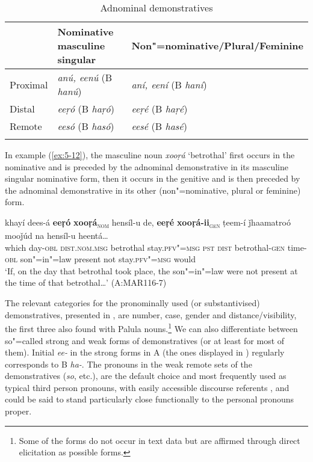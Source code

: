 \begin{table}[ht]
\caption{Adnominal demonstratives}
\begin{tabularx}{\textwidth}{ l@{\hspace{30pt}} Q Q }
\lsptoprule
&
Nominative masculine singular &
Non"=nominative/{\allowbreak}Plural/{\allowbreak}Feminine\\\hline
Proximal &
\textit{anú, eenú} (B \textit{hanú}) &
\textit{aní, eení} (B \textit{haní})\\
Distal &
\textit{eeṛó} (B \textit{haṛó}) &
\textit{eeṛé} (B \textit{haṛé})\\
Remote &
\textit{eesó} (B \textit{hasó}) &
\textit{eesé} (B \textit{hasé})\\\lspbottomrule
\end{tabularx}
\label{tab:5-3}
\end{table}



In example (\ref{ex:5-12}), the masculine noun \textit{xooṛá} `betrothal' first occurs in the nominative and is preceded by the adnominal demonstrative in its masculine singular nominative form, then it occurs in the genitive and is then preceded by the adnominal demonstrative in its other (non"=nominative, plural or feminine) form.


\begin{exe}
\ex
\label{ex:5-12}
\gll khayí dees-á {\ob}\textbf{eeṛó} \textbf{xooṛá}{\cb}\textsc{\textsubscript{nom}} hensíl-u de, {\ob}\textbf{eeṛé}
 \textbf{xooṛá-ii}{\cb}\textsc{\textsubscript{gen}} ṭeem-í ǰhaamatroó mooǰúd na hensíl-u
heentá{\dots} \\
which day-\textsc{obl} \textsc{dist.nom.msg} betrothal stay.\textsc{pfv"=msg} \textsc{pst}
\textsc{dist} betrothal-\textsc{gen} time-\textsc{obl} son"=in"=law present not stay.\textsc{pfv"=msg} would\\
\glt `If, on the day that betrothal took place, the son"=in"=law were not present at the time of that betrothal{\ldots}' (A:MAR116-7)
\end{exe}

The relevant categories for the pronominally used (or substantivised) demonstratives, presented in
, are number, case, gender and distance/visibility, the first three also found with Palula nouns.\footnote{Some of the forms do not occur in text data but are affirmed through direct elicitation as possible forms.} We can also differentiate between so"=called strong and weak forms of demonstratives (or at least for most of them). Initial \textit{ee-} in the strong forms in A (the ones displayed in ) regularly corresponds to B \textit{ha-}. The pronouns in the weak remote sets of the demonstratives (\textit{so}, etc.), are the default choice and most frequently used as typical third person pronouns, with easily accessible discourse referents \citep[432--433]{diessel2006}, and could be said to stand particularly close functionally to the personal pronouns proper. 


